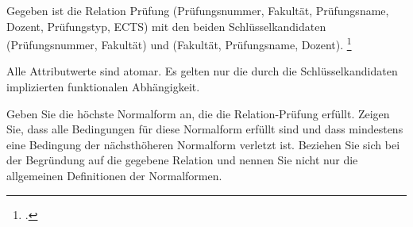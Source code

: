 \documentclass{bschlangaul-aufgabe}
\begin{document}

\let\FA=\bFunktionaleAbhaengigkeiten
\let\t=\texttt

Gegeben ist die Relation Prüfung (Prüfungsnummer, Fakultät,
Prüfungsname, Dozent, Prüfungstyp, ECTS) mit den beiden
Schlüsselkandidaten (Prüfungsnummer, Fakultät) und (Fakultät,
Prüfungsname, Dozent).
\footcite{examen:66116:2021:03}



Alle Attributwerte sind atomar. Es gelten nur die durch die
Schlüsselkandidaten implizierten funktionalen Abhängigkeit.

Geben Sie die höchste Normalform an, die die Relation-Prüfung erfüllt.
Zeigen Sie, dass alle Bedingungen für diese Normalform erfüllt sind
und dass mindestens eine Bedingung der nächsthöheren Normalform verletzt
ist. Beziehen Sie sich bei der Begründung auf die gegebene Relation und
nennen Sie nicht nur die allgemeinen Definitionen der Normalformen.
\end{document}
